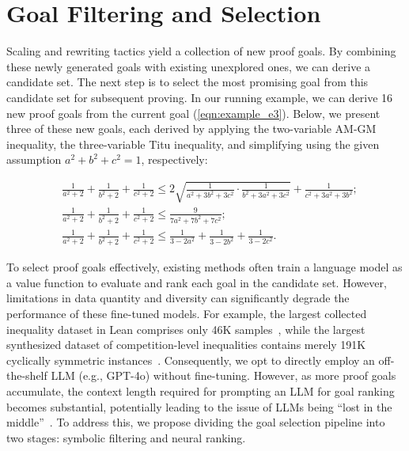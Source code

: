\section{Goal Filtering and Selection}
\label{sec:ranking}
Scaling and rewriting tactics yield a collection of new proof goals. By combining these newly generated goals with existing unexplored ones, we can derive a candidate set. The next step is to select the most promising goal from this candidate set for subsequent proving. In our running example, we can derive 16 new proof goals from the current goal (\ref{eqn:example_e3}). Below, we present three of these new goals, each derived by applying the two-variable AM-GM inequality, the three-variable Titu inequality, and simplifying using the given assumption $a^2+b^2+c^2=1$, respectively:
\begin{tcolorbox}[enhanced, colback=black!5!white, colframe=black!75!white, top=-4pt, bottom=2pt, left=2pt, right=2pt,]
\begin{align}  
& \frac{1}{a ^ 2 + 2} + \frac{1}{b ^ 2 + 2} + \frac{1}{c^2 + 2} \leq  2 \sqrt{\frac{1}{a ^ 2 + 3b ^ 2 + 3c ^ 2} \cdot \frac{1}{b ^ 2 + 3a ^ 2 + 3c ^ 2}} + \frac{1}{c^2 + 3a^2 + 3b^2}; \label{eqn:example_e4} \tag{4} \\  
& \frac{1}{a ^ 2 + 2} + \frac{1}{b ^ 2 + 2} + \frac{1}{c^2 + 2} \leq \frac{9}{7a ^ 2 + 7 b ^ 2 + 7 c ^ 2} \label{eqn:example_e5}; \tag{5} \\  
& \frac{1}{a ^ 2 + 2} + \frac{1}{b ^ 2 + 2} + \frac{1}{c^2 + 2} \leq \frac{1}{3 - 2a ^ 2} + \frac{1}{3 - 2b ^ 2} + \frac{1}{3 - 2c ^ 2}. \label{eqn:example_e6} \tag{6}  
\end{align}
\end{tcolorbox}

To select proof goals effectively, existing methods often train a language model as a value function to evaluate and rank each goal in the candidate set. However, limitations in data quantity and diversity can significantly degrade the performance of these fine-tuned models. For example, the largest collected inequality dataset in Lean comprises only 46K samples~\citep{ying2024lean}, while the largest synthesized dataset of competition-level inequalities contains merely 191K cyclically symmetric instances~\citep{wei2024proving}. Consequently, we opt to directly employ an off-the-shelf LLM (e.g., GPT-4o) without fine-tuning. However, as more proof goals accumulate, the context length required for prompting an LLM for goal ranking becomes substantial, potentially leading to the issue of LLMs being ``lost in the middle''~\citep{liu2024lost}. To address this, we propose dividing the goal selection pipeline into two stages: symbolic filtering and neural ranking.


